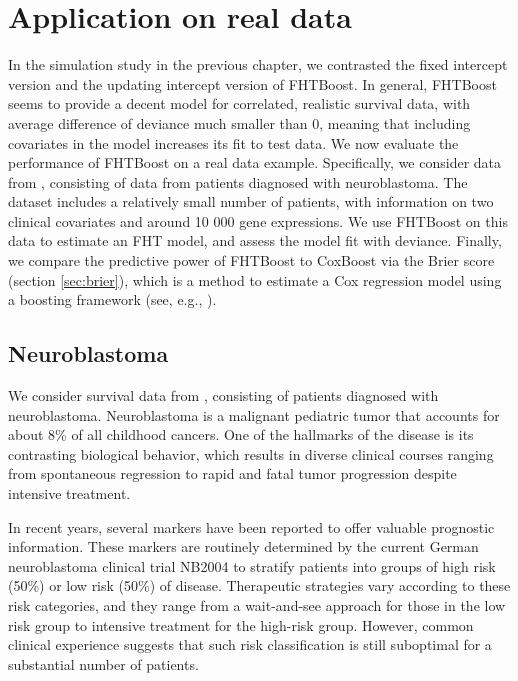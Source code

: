 \chapter{Application on real data}
In the simulation study in the previous chapter, we contrasted the fixed intercept version and the updating intercept version of FHTBoost.
In general, FHTBoost seems to provide a decent model for correlated, realistic survival data, with average difference of deviance much smaller than 0, meaning that including covariates in the model increases its fit to test data.
We now evaluate the performance of FHTBoost on a real data example.
Specifically, we consider data from \citet{oberthuer-data}, consisting of data from patients diagnosed with neuroblastoma.
The dataset includes a relatively small number of patients, with information on two clinical covariates and around 10 000 gene expressions.
We use FHTBoost on this data to estimate an FHT model, and assess the model fit with deviance.
Finally, we compare the predictive power of FHTBoost to CoxBoost via the Brier score (section \ref{sec:brier}), which is a method to estimate a Cox regression model using a boosting framework (see, e.g., \citet{BinderSchumacher2008}).

\section{Neuroblastoma}
We consider survival data from \citet{oberthuer-data}, consisting of patients diagnosed with neuroblastoma.
Neuroblastoma is a malignant pediatric tumor that accounts for about 8\% of all childhood cancers.
One of the hallmarks of the disease is its contrasting biological behavior, which results in diverse clinical courses ranging from spontaneous regression to rapid and fatal tumor progression despite intensive treatment.

In recent years, several markers have been reported to offer valuable prognostic information.
These markers are routinely determined by the current German neuroblastoma clinical trial NB2004 to stratify patients into groups of high risk (50\%) or low risk (50\%) of disease.
Therapeutic strategies vary according to these risk categories, and they range from a wait-and-see approach for those in the low risk group
to intensive treatment for the high-risk group.
However, common clinical experience suggests that such risk classification is still suboptimal for a substantial number of patients.

